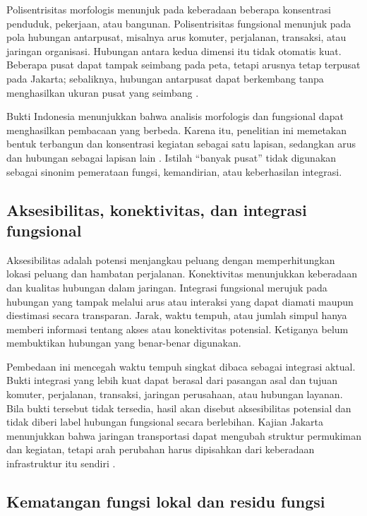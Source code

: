 \documentclass[11pt,a4paper,oneside,openany,indonesian]{report}
\begin{document}
Polisentrisitas morfologis menunjuk pada keberadaan beberapa konsentrasi penduduk, pekerjaan, atau bangunan. Polisentrisitas fungsional menunjuk pada pola hubungan antarpusat, misalnya arus komuter, perjalanan, transaksi, atau jaringan organisasi. Hubungan antara kedua dimensi itu tidak otomatis kuat. Beberapa pusat dapat tampak seimbang pada peta, tetapi arusnya tetap terpusat pada Jakarta; sebaliknya, hubungan antarpusat dapat berkembang tanpa menghasilkan ukuran pusat yang seimbang \parencite{burgermeijers2012,degoeietal2010}.

Bukti Indonesia menunjukkan bahwa analisis morfologis dan fungsional dapat menghasilkan pembacaan yang berbeda. Karena itu, penelitian ini memetakan bentuk terbangun dan konsentrasi kegiatan sebagai satu lapisan, sedangkan arus dan hubungan sebagai lapisan lain \parencite{sadewoetal2021}. Istilah ``banyak pusat'' tidak digunakan sebagai sinonim pemerataan fungsi, kemandirian, atau keberhasilan integrasi.

\subsection{Aksesibilitas, konektivitas, dan integrasi fungsional}

Aksesibilitas adalah potensi menjangkau peluang dengan memperhitungkan lokasi peluang dan hambatan perjalanan. Konektivitas menunjukkan keberadaan dan kualitas hubungan dalam jaringan. Integrasi fungsional merujuk pada hubungan yang tampak melalui arus atau interaksi yang dapat diamati maupun diestimasi secara transparan. Jarak, waktu tempuh, atau jumlah simpul hanya memberi informasi tentang akses atau konektivitas potensial. Ketiganya belum membuktikan hubungan yang benar-benar digunakan.

Pembedaan ini mencegah waktu tempuh singkat dibaca sebagai integrasi aktual. Bukti integrasi yang lebih kuat dapat berasal dari pasangan asal dan tujuan komuter, perjalanan, transaksi, jaringan perusahaan, atau hubungan layanan. Bila bukti tersebut tidak tersedia, hasil akan disebut aksesibilitas potensial dan tidak diberi label hubungan fungsional secara berlebihan. Kajian Jakarta menunjukkan bahwa jaringan transportasi dapat mengubah struktur permukiman dan kegiatan, tetapi arah perubahan harus dipisahkan dari keberadaan infrastruktur itu sendiri \parencite{yudhistiraetal2019}.

\subsection{Kematangan fungsi lokal dan residu fungsi}
\end{document}
